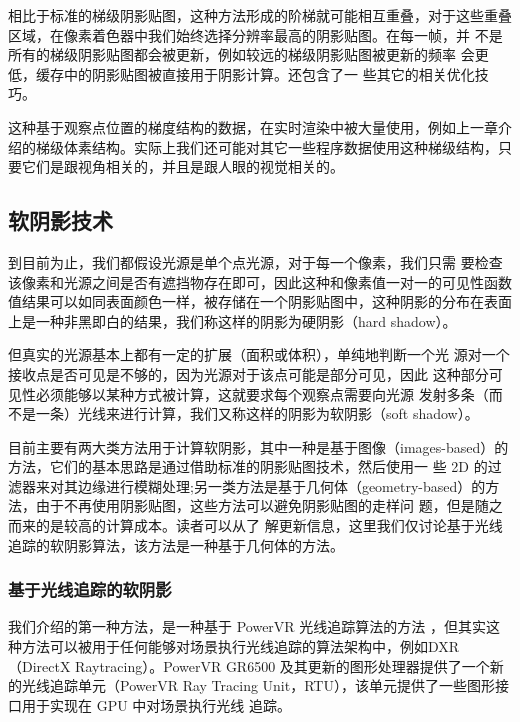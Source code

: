 相比于标准的梯级阴影贴图，这种方法形成的阶梯就可能相互重叠，对于这些重叠区域，在像素着色器中我们始终选择分辨率最高的阴影贴图。在每一帧，并 不是所有的梯级阴影贴图都会被更新，例如较远的梯级阴影贴图被更新的频率 会更低，缓存中的阴影贴图被直接用于阴影计算。\cite{a:PlayingwithReal-TimeShadows}还包含了一 些其它的相关优化技巧。

这种基于观察点位置的梯度结构的数据，在实时渲染中被大量使用，例如上一章介绍的梯级体素结构。实际上我们还可能对其它一些程序数据使用这种梯级结构，只要它们是跟视角相关的，并且是跟人眼的视觉相关的。


\subsection{软阴影技术}\label{sec:df-soft-shadow}
到目前为止，我们都假设光源是单个点光源，对于每一个像素，我们只需 要检查该像素和光源之间是否有遮挡物存在即可，因此这种和像素值一对一的可见性函数值结果可以如同表面颜色一样，被存储在一个阴影贴图中，这种阴影的分布在表面上是一种非黑即白的结果，我们称这样的阴影为硬阴影（hard shadow）。

但真实的光源基本上都有一定的扩展（面积或体积），单纯地判断一个光 源对一个接收点是否可见是不够的，因为光源对于该点可能是部分可见，因此 这种部分可见性必须能够以某种方式被计算，这就要求每个观察点需要向光源 发射多条（而不是一条）光线来进行计算，我们又称这样的阴影为软阴影（soft shadow）。

目前主要有两大类方法用于计算软阴影，其中一种是基于图像（images-based）的方法，它们的基本思路是通过借助标准的阴影贴图技术，然后使用一 些 2D 的过滤器来对其边缘进行模糊处理;另一类方法是基于几何体（geometry-based）的方法，由于不再使用阴影贴图，这些方法可以避免阴影贴图的走样问 题，但是随之而来的是较高的计算成本。读者可以从\cite{b:rts}了 解更新信息，这里我们仅讨论基于光线追踪的软阴影算法，该方法是一种基于几何体的方法。




\subsubsection{基于光线追踪的软阴影}
我们介绍的第一种方法，是一种基于 PowerVR 光线追踪算法的方法 \cite{a:Implementingfastraytracedsoftshadowsinagameengine}，但其实这种方法可以被用于任何能够对场景执行光线追踪的算法架构中，例如DXR（DirectX Raytracing）。PowerVR GR6500 及其更新的图形处理器提供了一个新的光线追踪单元（PowerVR Ray Tracing Unit，RTU），该单元提供了一些图形接口用于实现在 GPU 中对场景执行光线 追踪。

